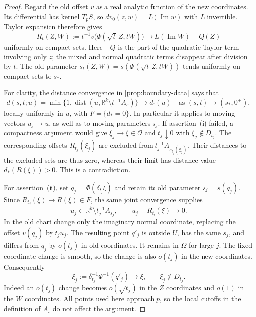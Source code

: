 \begin{proof}
Regard the old offset $v$ as a real analytic function of the new coordinates.  Its differential has kernel $T_pS$, so $dv_0(z,w)=L(\operatorname{Im}w)$ with $L$ invertible.  Taylor expansion therefore gives
\begin{equation}
\label{eq:residual-scaling}
 R_t(Z,W):=t^{-1}v\bigl(\Phi(\sqrt t\,Z,tW)\bigr)
 \longrightarrow L(\operatorname{Im}W)-Q(Z)
\end{equation}
uniformly on compact sets.  Here $-Q$ is the part of the quadratic Taylor term involving only $z$; the mixed and normal quadratic terms disappear after division by $t$.  The old parameter $s_t(Z,W)=s(\Phi(\sqrt t\,Z,tW))$ tends uniformly on compact sets to $s_*$.

For clarity, the distance convergence in \cref{prop:boundary-data} says that
\[
 d(s,t;u)=\min\{1,\operatorname{dist}
       (u,\mathbb{R}^k\setminus t^{-1}A_s)\}
 \longrightarrow d_*(u)
 \quad\text{as }(s,t)\longrightarrow(s_*,0^+),
\]
locally uniformly in $u$, with $F=\{d_*=0\}$.  In particular it applies to moving vectors $u_j\to u$, as well as to moving parameters $s_j$. If assertion~\textup{(i)} failed, a compactness argument would give $\xi_j\to\xi\in\mathcal{O}$ and $t_j\downarrow0$ with $\xi_j\notin D_{t_j}$.  The corresponding offsets $R_{t_j}(\xi_j)$ are excluded from $t_j^{-1}A_{s_{t_j}(\xi_j)}$. Their distances to the excluded sets are thus zero, whereas their limit has distance value $d_*(R(\xi))>0$.  This is a contradiction.

For assertion~\textup{(ii)}, set $q_j=\Phi(\delta_{t_j}\xi)$ and retain its old parameter $s_j=s(q_j)$.  Since $R_{t_j}(\xi)\to R(\xi)\in F$, the same joint convergence supplies
\[
 u_j\in\mathbb{R}^k\setminus t_j^{-1}A_{s_j},
 \qquad u_j-R_{t_j}(\xi)\longrightarrow0.
\]
In the old chart change only the imaginary normal coordinate, replacing the offset $v(q_j)$ by $t_ju_j$.  The resulting point $q'_j$ is outside $U$, has the same $s_j$, and differs from $q_j$ by $o(t_j)$ in old coordinates.  It remains in $\Omega$ for large $j$.  The fixed coordinate change is smooth, so the change is also $o(t_j)$ in the new coordinates. Consequently
\[
 \xi_j:=\delta_{t_j}^{-1}\Phi^{-1}(q'_j)
 \longrightarrow\xi,
 \qquad \xi_j\notin D_{t_j}.
\]
Indeed an $o(t_j)$ change becomes $o(\sqrt{t_j})$ in the $Z$ coordinates and $o(1)$ in the $W$ coordinates.  All points used here approach $p$, so the local cutoffs in the definition of $A_s$ do not affect the argument.
\end{proof}

